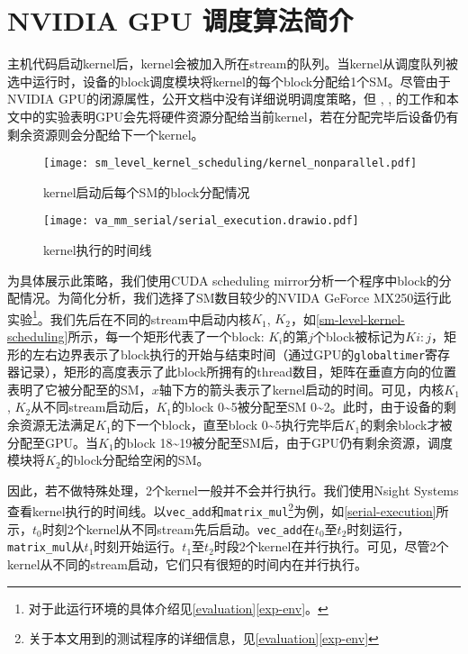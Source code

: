 \section{NVIDIA GPU 调度算法简介}\label{nvidia-sched}

主机代码启动kernel后，kernel会被加入所在stream的队列。当kernel从调度队列被选中运行时，设备的block调度模块将kernel的每个block分配给1个SM。尽管由于NVIDIA GPU的闭源属性，公开文档中没有详细说明调度策略，但 \citet{8277284}, \citet{9113104}, \citet{8853389}的工作和本文中的实验表明GPU会先将硬件资源分配给当前kernel，若在分配完毕后设备仍有剩余资源则会分配给下一个kernel。

\begin{figure}[htbp]
    \centering
    \texttt{[image: sm\_level\_kernel\_scheduling/kernel\_nonparallel.pdf]}
    \caption{kernel启动后每个SM的block分配情况}
    \label{sm-level-kernel-scheduling}
\end{figure}

\begin{figure}[htbp]
    \centering
    \texttt{[image: va\_mm\_serial/serial\_execution.drawio.pdf]}
    \caption{kernel执行的时间线}
    \label{serial-execution}
\end{figure}

为具体展示此策略，我们使用CUDA scheduling mirror\cite{otterness2017inferring}分析一个程序中block的分配情况。为简化分析，我们选择了SM数目较少的NVIDA GeForce MX250运行此实验\footnote{对于此运行环境的具体介绍见\autoref{evaluation}\autoref{exp-env}。}。我们先后在不同的stream中启动内核$K_1$, $K_2$，如\autoref{sm-level-kernel-scheduling}所示，每一个矩形代表了一个block: $K_i$的第$j$个block被标记为$Ki:j$，矩形的左右边界表示了block执行的开始与结束时间（通过GPU的\texttt{globaltimer}寄存器记录），矩形的高度表示了此block所拥有的thread数目，矩阵在垂直方向的位置表明了它被分配至的SM，$x$轴下方的箭头表示了kernel启动的时间。可见，内核$K_1$, $K_2$从不同stream启动后，$K_1$的block 0\textasciitilde 5被分配至SM 0\textasciitilde 2。此时，由于设备的剩余资源无法满足$K_1$的下一个block，直至block 0\textasciitilde 5执行完毕后$K_1$的剩余block才被分配至GPU。当$K_1$的block 18\textasciitilde 19被分配至SM后，由于GPU仍有剩余资源，调度模块将$K_2$的block分配给空闲的SM。

因此，若不做特殊处理，2个kernel一般并不会并行执行。我们使用Nsight Systems\cite{nsightsystems}查看kernel执行的时间线。以\texttt{vec\_add}和\texttt{matrix\_mul}\footnote{关于本文用到的测试程序的详细信息，见\autoref{evaluation}\autoref{exp-env}}为例，如\autoref{serial-execution}所示，$t_0$时刻2个kernel从不同stream先后启动。\texttt{vec\_add}在$t_0$至$t_2$时刻运行，\texttt{matrix\_mul}从$t_1$时刻开始运行。$t_1$至$t_2$时段2个kernel在并行执行。可见，尽管2个kernel从不同的stream启动，它们只有很短的时间内在并行执行。

